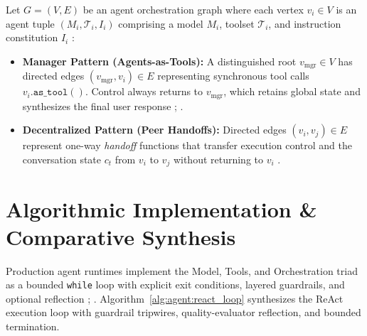 \documentclass[../../../../master.tex]{subfiles}
\begin{document}
\begin{coremath}
Let $G = (V, E)$ be an agent orchestration graph where each vertex $v_i \in V$ is an agent tuple $(M_i, \mathcal{T}_i, I_i)$ comprising a model $M_i$, toolset $\mathcal{T}_i$, and instruction constitution $I_i$ :
\begin{itemize}
  \item \textbf{Manager Pattern (Agents-as-Tools):} A distinguished root $v_{\mathrm{mgr}} \in V$ has directed edges $(v_{\mathrm{mgr}}, v_i) \in E$ representing synchronous tool calls $v_i.\texttt{as\_tool}()$. Control always returns to $v_{\mathrm{mgr}}$, which retains global state and synthesizes the final user response ; .
  \item \textbf{Decentralized Pattern (Peer Handoffs):} Directed edges $(v_i, v_j) \in E$ represent one-way \emph{handoff} functions that transfer execution control and the conversation state $c_t$ from $v_i$ to $v_j$ without returning to $v_i$ .
\end{itemize}
\end{coremath}

\section{Algorithmic Implementation \& Comparative Synthesis}
\label{sec:agent:algorithms}

{\sloppy
Production agent runtimes implement the Model, Tools, and Orchestration triad as a bounded \texttt{while} loop with explicit exit conditions, layered guardrails, and optional reflection ; . Algorithm~\ref{alg:agent:react_loop} synthesizes the ReAct execution loop with guardrail tripwires, quality-evaluator reflection, and bounded termination.\par}
\end{document}
